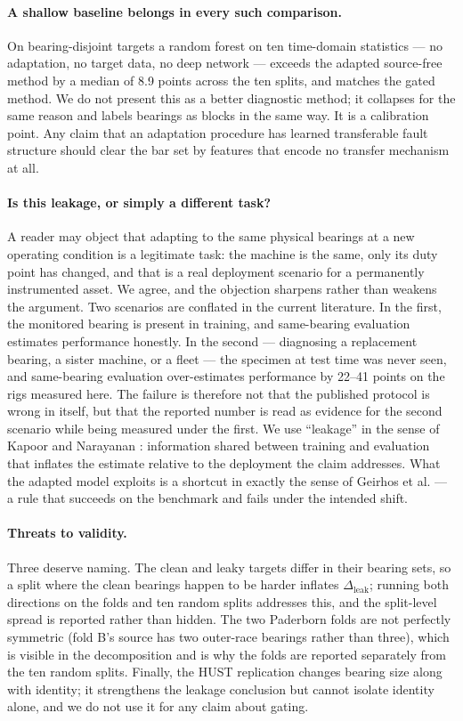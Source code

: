 \paragraph{A shallow baseline belongs in every such comparison.} On bearing-disjoint targets a random forest on ten
time-domain statistics --- no adaptation, no target data, no deep network --- exceeds the adapted source-free method by a
median of 8.9 points across the ten splits, and matches the gated method. We do not present this as a better diagnostic
method; it collapses for the same reason and labels bearings as blocks in the same way. It is a calibration point. Any
claim that an adaptation procedure has learned transferable fault structure should clear the bar set by features that
encode no transfer mechanism at all.

\paragraph{Is this leakage, or simply a different task?}
A reader may object that adapting to the same physical bearings at a new operating condition is a legitimate task: the
machine is the same, only its duty point has changed, and that is a real deployment scenario for a permanently instrumented
asset. We agree, and the objection sharpens rather than weakens the argument. Two scenarios are conflated in the current
literature. In the first, the monitored bearing is present in training, and same-bearing evaluation estimates performance
honestly. In the second --- diagnosing a replacement bearing, a sister machine, or a fleet --- the specimen at test time was
never seen, and same-bearing evaluation over-estimates performance by 22--41 points on the rigs measured here. The failure is
therefore not that the published protocol is wrong in itself, but that the reported number is read as evidence for the
second scenario while being measured under the first. We use ``leakage'' in the sense of Kapoor and Narayanan
\cite{kapoor2023leakage}: information shared between training and evaluation that inflates the estimate relative to the
deployment the claim addresses. What the adapted model exploits is a shortcut in exactly the sense of Geirhos et al.
\cite{geirhos2020shortcut} --- a rule that succeeds on the benchmark and fails under the intended shift.

\paragraph{Threats to validity.} Three deserve naming. The clean and leaky targets differ in their bearing sets, so a split
where the clean bearings happen to be harder inflates $\Delta_{\mathrm{leak}}$; running both directions on the folds and ten
random splits addresses this, and the split-level spread is reported rather than hidden. The two Paderborn folds are not
perfectly symmetric (fold B's source has two outer-race bearings rather than three), which is visible in the decomposition
and is why the folds are reported separately from the ten random splits. Finally, the HUST replication changes bearing size
along with identity; it strengthens the leakage conclusion but cannot isolate identity alone, and we do not use it for any
claim about gating.
